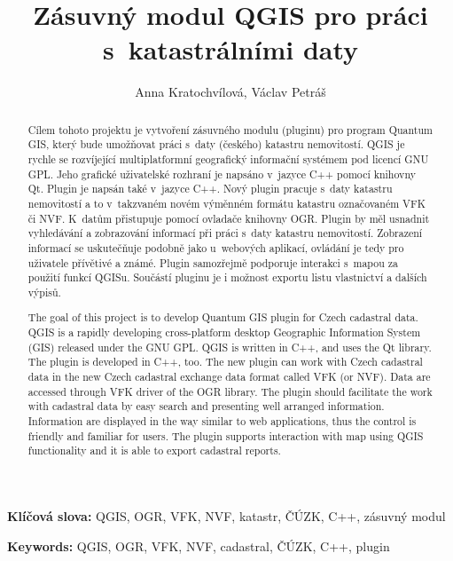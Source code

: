 \documentclass[a4paper,12pt]{article}
\title{Zásuvný modul QGIS pro práci s~katastrálními daty}
\author{Anna Kratochvílová, Václav Petráš}
\newcommand{\klicslova}[2]{\noindent\textbf{#1: }#2}
\begin{document}

\newpage
\pagestyle{empty}
\begin{abstract}
Cílem tohoto projektu je vytvoření zásuvného modulu (pluginu) pro program Quantum GIS,
který bude umožňovat práci s~daty (českého) katastru nemovitostí.
QGIS je rychle se rozvíjející  multiplatformní geografický informační systémem pod licencí GNU GPL.
Jeho grafické uživatelské rozhraní je napsáno v~jazyce C++ pomocí knihovny Qt. Plugin je napsán také v~jazyce C++.
Nový plugin pracuje s~daty katastru nemovitostí a to v~takzvaném novém výměnném formátu katastru označovaném VFK či NVF.
K~datům přistupuje pomocí ovladače knihovny OGR. Plugin by měl usnadnit vyhledávání a zobrazování
informací při práci s~daty katastru nemovitostí.
Zobrazení informací se uskutečňuje podobně jako u~webových aplikací, ovládání je tedy pro uživatele přívětivé a známé.
Plugin samozřejmě podporuje interakci s~mapou za použití funkcí QGISu.
Součástí pluginu je i možnost exportu listu vlastnictví a dalších výpisů.
\end{abstract}

\bigskip

\klicslova{Klíčová slova}{QGIS, OGR, VFK, NVF, katastr, ČÚZK, C++, zásuvný modul}
\begin{abstract}
The goal of this project is to develop Quantum GIS plugin for Czech cadastral data.
QGIS is a rapidly developing cross-platform desktop Geographic Information System (GIS) released under the GNU GPL.
QGIS is written in C++, and uses the Qt library.
The plugin is developed in C++, too.
The new plugin can work with Czech cadastral data in the new Czech cadastral exchange data format called VFK (or NVF).
Data are accessed through VFK driver of the OGR library.
The plugin should facilitate the work with cadastral data by easy search and presenting well arranged information.
Information are displayed in the way similar to web applications, thus the control is friendly and familiar for users.
The plugin supports interaction with map using QGIS functionality and it is able to export cadastral reports.
\end{abstract}

\bigskip

\klicslova{Keywords}{QGIS, OGR, VFK, NVF, cadastral, ČÚZK, C++, plugin}
\newpage

\pagestyle{plain}
\tableofcontents
\newpage
\end{document}
